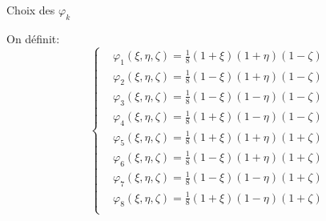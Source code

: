 \documentclass[
mode=present,    %
paper=a4paper,   %
orient=landscape,
display=slides,   %
size=10pt,     %
style=romain   %
]{powerdot}
\begin{document}
\begin{slide}[toc=]{Choix des $\varphi_k$}

On définit:
\begin{equation*}
    \left\{
        \begin{aligned}
            &\varphi_1(\xi,\eta,\zeta) = \frac{1}{8} (1+\xi) (1+\eta) (1-\zeta) \\
            &\varphi_2(\xi,\eta,\zeta) = \frac{1}{8} (1-\xi) (1+\eta) (1-\zeta) \\
            &\varphi_3(\xi,\eta,\zeta) = \frac{1}{8} (1-\xi) (1-\eta) (1-\zeta) \\
            &\varphi_4(\xi,\eta,\zeta) = \frac{1}{8} (1+\xi) (1-\eta) (1-\zeta) \\
            &\varphi_5(\xi,\eta,\zeta) = \frac{1}{8} (1+\xi) (1+\eta) (1+\zeta) \\
            &\varphi_6(\xi,\eta,\zeta) = \frac{1}{8} (1-\xi) (1+\eta) (1+\zeta) \\
            &\varphi_7(\xi,\eta,\zeta) = \frac{1}{8} (1-\xi) (1-\eta) (1+\zeta) \\
            &\varphi_8(\xi,\eta,\zeta) = \frac{1}{8} (1+\xi) (1-\eta) (1+\zeta) \\
        \end{aligned}
    \right.
\end{equation*}

\end{slide}
\end{document}
